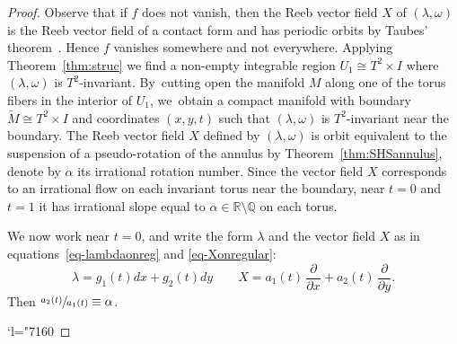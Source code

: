 \documentclass[11pt]{article}
\newcommand{\Changel}{\mathcode`l="7160}
\theoremstyle{definition}
\newcommand{\pp}[2]{\frac{\partial#1}{\partial#2}}
\begin{document}
\begin{proof}
Observe that if $f$ does not vanish, then the Reeb vector field $X$ of $(\lambda, \omega)$ is the Reeb vector field of a contact form and has periodic orbits by Taubes' theorem~\cite{Taub}. Hence $f$ vanishes somewhere and not everywhere. Applying Theorem~\ref{thm:struc} we find a non-empty integrable region $U_1\cong T^2\times I$ where $(\lambda,\omega)$ is $T^2$-invariant. By~cutting open the manifold $M$ along one of the torus fibers in the interior of $U_1$, we~obtain a compact manifold with boundary $\widetilde M\cong T^2\times I$ and coordinates $(x,y,t)$ such that $(\lambda,\omega)$ is $T^2$-invariant near the boundary. The Reeb vector field $X$ defined by $(\lambda,\omega)$ is orbit equivalent to the suspension of a pseudo-rotation of the annulus by Theorem~\ref{thm:SHSannulus}, denote by $\alpha$ its irrational rotation number. Since the vector field $X$ corresponds to an irrational flow on each invariant torus near the boundary, near $t=0$ and $t=1$ it has irrational slope equal to $\alpha\in\mathbb{R}\setminus\mathbb{Q}$ on each torus.

We now work near $t=0$, and write the form $\lambda$ and the vector field $X$ as in equations~\eqref{eq-lambdaonreg} and \eqref{eq-Xonregular}:
\[
\lambda=g_1(t)dx+g_2(t)dy \qquad X= a_1(t)\,\pp{}{x}+a_2(t)\,\pp{}{y}.
\]
Then $\sfrac{a_2(t)}{a_1(t)}\equiv \alpha$.

\Changel


\end{proof}
\end{document}

